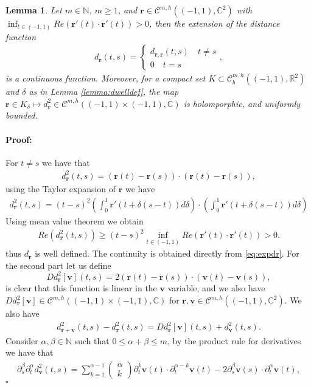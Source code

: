 \documentclass{article}
\newtheorem{lemma}[theorem]{Lemma}
\newenvironment{proof}{\paragraph{Proof:}}{\hfill$\square$}
\newcommand{\IC}{{\mathbb C}}
\newcommand{\IN}{{\mathbb N}}
\newcommand{\IR}{{\mathbb R}}
\newcommand{\cmspaceh}[4]{\mathcal{C}^{#1,#2} \left( #3, #4 \right)}
\newcommand{\rgeoh}[2]{\mathcal{C}_b^{#1,#2}\left( (-1,1), \IR^2 \right)}
\newcommand{\cgeoh}[1]{\mathcal{C}^{#1,h}\left( (-1,1), \IC^2 \right)}
\newcommand{\bv}{\bm{v}}
\newcommand{\br}{\bm{r}}
\newcommand{\iinterv}{(-1,1)\times(-1,1)}
\begin{document}
\begin{lemma}
\label{lemma:dself}
Let $m \in \IN$, $m\geq 1$, and $\br \in  \cgeoh{m}$ with $\inf_{t \in (-1,1)}Re(\br'(t) \cdot \br'(t)) >0$, then the extension of the distance function 
\begin{align*}
d_{\br} (t,s) = \begin{cases} d_{\br,\br}(t,s) \quad t\neq s \\ 
0 \quad t=s \end{cases},
\end{align*} 
is a continuous function. Moreover, for a compact set $K \subset \rgeoh{m}{h}$ and $\delta$ as in Lemma \ref{lemma:dwelldef}, the map $\br \in K_\delta \mapsto d_{\br}^2 \in \cmspaceh{m}{h}{(-1,1)\times(-1,1)}{\IC}$ is holomporphic, and uniformly bounded.   
\end{lemma}
\begin{proof}
For $t \neq s$ we have that
\begin{align*}
d_{\br}^2(t,s) = (\br(t)-\br(s))\cdot (\br(t) -\br(s)),
\end{align*}
using the Taylor expansion of $\br$ we have 
\begin{align}
\label{eq:expdr}
d_{\br}^2(t,s) = (t-s)^2 \left(\int_{0}^1 \br'(t+\delta(s-t))d\delta \right) \cdot \left(\int_{0}^1 \br'(t+\delta(s-t))d\delta \right)
\end{align}
Using mean value theorem we obtain 
\begin{align}
\label{eq:ddbound}
Re ( d_{\br}^2(t,s)  )  \geq (t-s)^2 \inf_{t \in (-1,1)} Re(\br'(t) \cdot \br'(t)) >0.
\end{align}
thus $d_{\br}$ is well defined. The continuity is obtained directly from \eqref{eq:expdr}. For the second part let us define 
$$
D d_{\br}^2[\bv](t,s) = 2 (\br(t)-\br(s))\cdot (\bv(t) - \bv(s)),
$$
is clear that this function is linear in the $\bv$ variable, and we also have $D d_{\br}^2[\bv] \in \cmspaceh{m}{h}{\iinterv}{\IC}$ for $\br,\bv \in \cmspaceh{m}{h}{(-1,1)}{\IC^2}$. We also have 
\begin{align*}
d^2_{\br+\bv}(t,s) -d^2_{\br}(t,s) =  D d_{\br}^2[\bv](t,s) + d^2_{\bv}(t,s).
\end{align*}
Consider $\alpha, \beta \in \IN$ such that $0 \leq \alpha +\beta \leq m$, by the product rule for derivatives we have that 
\begin{align*}
\partial_s^\beta \partial_t^\alpha d^2_{\bv}(t,s) = \sum_{k=1}^{\alpha-1} \begin{pmatrix} \alpha \\ k \end{pmatrix} \partial_t^k \bv(t) \cdot \partial^{\alpha-k}_t \bv(t) - 2\partial_s^\beta \bv(s) \cdot \partial^\alpha_t \bv(t),

\end{align*}
\end{proof}
\end{document}
